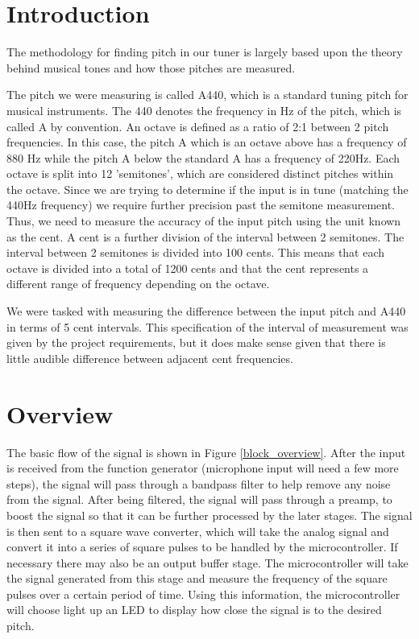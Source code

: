 \documentclass[12pt]{article}
\begin{document}
\newpage
\section{Introduction}


The methodology for finding pitch in our tuner is largely based upon the theory behind musical tones
and how those pitches are measured.

The pitch we were measuring is called A440, which is a standard tuning pitch for musical instruments.
The 440 denotes the frequency in Hz of the pitch, which is called A by convention. An octave is defined
as a ratio of 2:1 between 2 pitch frequencies. In this case, the pitch A which is an octave above has a
frequency of 880 Hz while the pitch A below the standard A has a frequency of 220Hz. Each octave
is split into 12 'semitones', which are considered distinct pitches within the octave. Since we are
trying to determine if the input is in tune (matching the 440Hz frequency) we require further precision
past the semitone measurement. Thus, we need to measure the accuracy of the input pitch using the
unit known as the cent. A cent is a further division of the interval between 2 semitones. The interval
between 2 semitones is divided into 100 cents. This means that each octave is divided into a total of
1200 cents and that the cent represents a different range of frequency depending on the octave.

We were tasked with measuring the difference between the input pitch and A440 in terms of 5 cent
intervals. This specification of the interval of measurement was given by the project requirements, but
it does make sense given that there is little audible difference between adjacent cent frequencies.

\section{Overview}
The basic flow of the signal is shown in Figure \ref{block_overview}. After the input is received from the function 
generator (microphone input will need a few more steps), the signal will pass through a bandpass filter to help
remove any noise from the signal. After being filtered, the signal will pass through a preamp, to boost
the signal so that it can be further processed by the later stages. The signal is then sent to a square
wave converter, which will take the analog signal and convert it into a series of square pulses to be
handled by the microcontroller. If necessary there may also be an output buffer stage. The microcontroller
will take the signal generated from this stage and measure the frequency of the square pulses over a certain
period of time. Using this information, the microcontroller will choose light up an LED to display how close the
signal is to the desired pitch.
\end{document}
